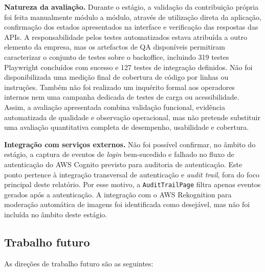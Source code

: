 \textbf{Natureza da avaliação.} Durante o estágio, a validação da contribuição própria foi feita manualmente módulo a módulo, através de utilização direta da aplicação, confirmação dos estados apresentados na interface e verificação das respostas das \glspl{API}. A responsabilidade pelos testes automatizados estava atribuída a outro elemento da empresa, mas os artefactos de \gls{QA} disponíveis permitiram caracterizar o conjunto de testes sobre o backoffice, incluindo 319 testes Playwright concluídos com sucesso e 127 testes de integração definidos. Não foi disponibilizada uma medição final de cobertura de código por linhas ou instruções. Também não foi realizado um inquérito formal aos operadores internos nem uma campanha dedicada de testes de carga ou acessibilidade. Assim, a avaliação apresentada combina validação funcional, evidência automatizada de qualidade e observação operacional, mas não pretende substituir uma avaliação quantitativa completa de desempenho, usabilidade e cobertura.

\textbf{Integração com serviços externos.} Não foi possível confirmar, no âmbito do estágio, a captura de eventos de \textit{login} bem-sucedido e falhado no fluxo de autenticação do AWS Cognito previsto para auditoria de autenticação. Este ponto pertence à integração transversal de autenticação e \textit{audit trail}, fora do foco principal deste relatório. Por esse motivo, a \texttt{AuditTrailPage} filtra apenas eventos gerados após a autenticação. A integração com o AWS Rekognition para moderação automática de imagens foi identificada como desejável, mas não foi incluída no âmbito deste estágio.

\subsection{Trabalho futuro}
\label{subsec:trabalho_futuro}

As direções de trabalho futuro são as seguintes:

